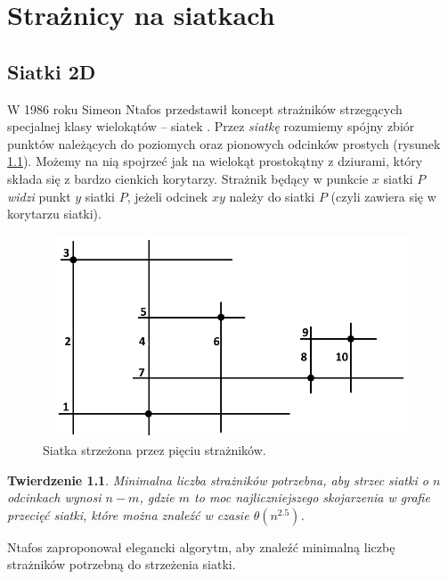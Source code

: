 \documentclass{xmgr}
\newtheorem{Twierdzenie}{Twierdzenie}
\theoremstyle{definition}
\begin{document}
\chapter{Strażnicy na siatkach}
\section{Siatki 2D} \label{sec:siatki}
W 1986 roku Simeon Ntafos przedstawił koncept strażników strzegących specjalnej klasy wielokątów -- siatek \cite{ntafos}.
Przez \emph{siatkę} rozumiemy spójny zbiór punktów należących do poziomych oraz pionowych odcinków prostych (rysunek \ref{fig:siatka 2d}). Możemy na nią spojrzeć jak na wielokąt prostokątny z dziurami, który składa się z bardzo cienkich korytarzy.
Strażnik będący w punkcie $x$ siatki $P$ \emph{widzi} punkt $y$ siatki $P$, jeżeli odcinek $xy$ należy do siatki $P$ (czyli zawiera się w korytarzu siatki).
 \begin{figure}[ht!]
   \centering
   \includegraphics[width=14cm,height=6cm]{rysunki/przykladowa_siatka.png}
   \caption{Siatka strzeżona przez pięciu strażników.}
   \label{fig:siatka 2d}
 \end{figure} 

\begin{Twierdzenie} \cite{ntafos}
	Minimalna liczba strażników potrzebna, aby strzec siatki o $n$ odcinkach wynosi $n-m$, gdzie $m$ to moc najliczniejszego skojarzenia w grafie przecięć siatki, które można znaleźć w czasie $\theta(n^{2.5})$.
\end{Twierdzenie}

Ntafos zaproponował elegancki algorytm, aby znaleźć minimalną liczbę strażników potrzebną do strzeżenia siatki.
\end{document}
